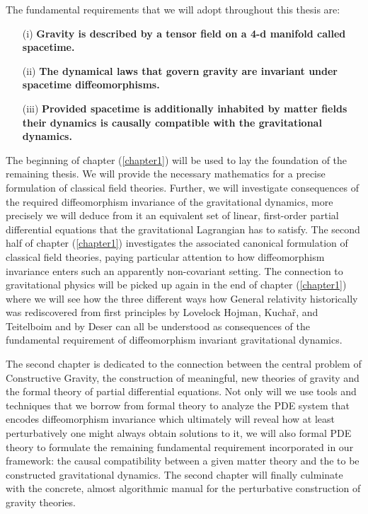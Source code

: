 The fundamental requirements that we will adopt throughout this thesis are:
\begin{itemize}
    \item[(i)] \textbf{Gravity is described by a tensor field on a 4-d manifold called spacetime.}
    \item[(ii)] \textbf{The dynamical laws that govern gravity are invariant under spacetime diffeomorphisms.}
    \item[(iii)] \textbf{Provided spacetime is additionally inhabited by matter fields their dynamics is causally compatible with the gravitational dynamics.}
\end{itemize}

The beginning of chapter (\ref{chapter1}) will be used to lay the foundation of the remaining thesis. We will provide the necessary mathematics for a precise formulation of classical field theories. Further, we will investigate consequences of the required diffeomorphism invariance of the gravitational dynamics, more precisely we will deduce from it an equivalent set of linear, first-order partial differential equations that the gravitational Lagrangian has to satisfy. The second half of chapter (\ref{chapter1}) investigates the associated canonical formulation of classical field theories, paying particular attention to how diffeomorphism invariance enters such an apparently non-covariant setting. The connection to gravitational physics will be picked up again in the end of chapter (\ref{chapter1}) where we will see how the three different ways how General relativity historically was rediscovered from first principles by Lovelock \cite{doi:10.1063/1.1665613} Hojman, Kuchař, and Teitelboim \cite{HOJMAN197688} and by Deser \cite{1970GReGr...1....9D} can all be understood as consequences of the fundamental requirement of diffeomorphism invariant gravitational dynamics.

The second chapter is dedicated to the connection between the central problem of Constructive Gravity, the construction of meaningful, new theories of gravity and the formal theory of partial differential equations. Not only will we use tools and techniques that we borrow from formal theory to analyze the PDE system that encodes diffeomorphism invariance which ultimately will reveal how at least perturbatively one might always obtain solutions to it, we will also formal PDE theory to formulate the remaining fundamental requirement incorporated in our framework: the causal compatibility between a given matter theory and the to be constructed gravitational dynamics. The second chapter will finally culminate with the concrete, almost algorithmic manual for the perturbative construction of gravity theories.  

